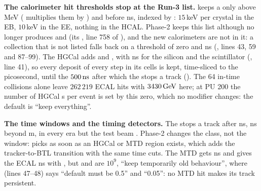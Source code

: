\textbf{The calorimeter hit thresholds stop at the Run-3 list.}  keeps a  only above
 MeV ( multiplies them by
) and before  ns, indexed by : $15$\,keV per crystal in the EB, $10$\,keV in the EE,
nothing in the HCAL. Phase-2 keeps this list although  no longer produces
 and  (its , line 758 of ), and the new
calorimeters are not in it: a collection that is not listed falls back on a threshold of zero and  ns (, lines 43, 59 and 87--99). The HGCal adds  and
, with  ns for the silicon and the scintillator
(, line 41), so every deposit of every step in its cells is kept, time-sliced to
the picosecond, until the $500\,\mathrm{ns}$ after which the  stops a track (). The 64
in-time collisions alone leave $262\,219$ ECAL hits with $3430\,\mathrm{GeV}$ here; at PU 200 the number of HGCal
s per event is set by this zero, which no modifier changes: the default is ``keep everything''.

\textbf{The time windows and the timing detectors.} The  stops a track after
 ns,  ns beyond  m, in
every era but the test beam . Phase-2 changes the class, not the window:
 picks  as soon as an
HGCal or MTD region exists, which adds the tracker-to-BTL transition with the same time cuts. The MTD gets
 ns and  gives the ECAL  ns with
, but  and  are
$10^9$, ``keep temporarily old behaviour'', where  (lines 47--48) says ``default
must be 0.5'' and ``0.05'': no MTD hit makes its track persistent.


